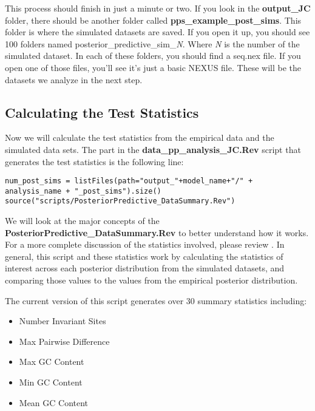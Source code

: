 This process should finish in just a minute or two. If you look in the \textbf{output\_JC} folder, there should be 
another folder called \textbf{pps\_example\_post\_sims}. This folder is where the simulated datasets are saved. 
If you open it up, you should see 100 folders named posterior\_predictive\_sim\_\textit{N}. Where \textit{N} 
is the number of the simulated dataset. In each of these folders, you should find a seq.nex file. If you 
open one of those files, you'll see it's just a basic NEXUS file. These will be the datasets we analyze 
in the next step.


\subsection{Calculating the Test Statistics}

Now we will calculate the test statistics from the 
empirical data and the simulated data sets. The part in the \textbf{data\_pp\_analysis\_JC.Rev}
script that generates the test statistics is the following line:

{\tt \begin{Snugshade}[184,207,236]
\begin{lstlisting}
num_post_sims = listFiles(path="output_"+model_name+"/" + analysis_name + "_post_sims").size()
source("scripts/PosteriorPredictive_DataSummary.Rev")
\end{lstlisting}
\end{Snugshade}}


We will look at the 
major concepts of the \textbf{PosteriorPredictive\_DataSummary.Rev} to better understand how it works. For a more complete discussion of the 
statistics involved, please review \cite{Brown2014-mb, Doyle2015-qb}. In general, this script and these 
statistics work by calculating the statistics of interest across each posterior distribution from the 
simulated datasets, and comparing those values to the values from the empirical posterior distribution.

The current version of this script generates over 30 summary statistics including: 
\begin{itemize}
\item Number Invariant Sites
\item Max Pairwise Difference
\item Max GC Content
\item Min GC Content
\item Mean GC Content
\end{itemize}

